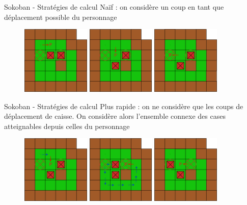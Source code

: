\documentclass{beamer}
\begin{document}
\begin{frame}{Sokoban - Stratégies de calcul}
	\pause
	Naïf : on considère un coup en tant que déplacement possible du personnage
	\begin{figure}[!h]
		\pause
		\includegraphics[width=3.25cm]{Coup1_strat1.eps}
		\pause
		\includegraphics[width=3.25cm]{Coup2_strat1.eps}
		\pause
		\includegraphics[width=3.25cm]{Coup3_strat1.eps}
	\end{figure}
\end{frame}

\begin{frame}{Sokoban - Stratégies de calcul}
	\pause
	Plus rapide : on ne considère que les coups de déplacement de caisse. On considère alors l'ensemble connexe des cases atteignables depuis celles du personnage
	\begin{figure}[!h]
		\pause
		\includegraphics[width=3.25cm]{Coup1_strat2.eps}
		\pause
		\includegraphics[width=3.25cm]{Coup2_strat2.eps}
		\pause
		\includegraphics[width=3.25cm]{Coup3_strat2.eps}
	\end{figure}
\end{frame}
\end{document}
